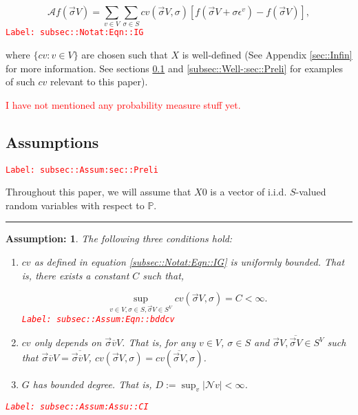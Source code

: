 \documentclass[12pt]{article}
\newcommand{\mb}{\mathbb}
\newcommand{\mc}{\mathcal}
\newcommand{\ov}{\overline}
\newcommand{\ep}{\epsilon}
\newcommand{\tr}{\textcolor{red}}
\newcommand{\labe}[1]{\tr{\texttt{Label: #1}}}
\newcommand{\lin}{\rule{\linewidth}{0.4 pt}}
\newcommand{\pr}{\mb{P}}							%
\newcommand{\defeq}{:=}								%
\renewcommand{\v}{v}							%
\renewcommand{\S}{S}							%
\newcommand{\s}{\sigma}							%
\newcommand{\sv}{\vec{\s}}						%
\newcommand{\ev}[1]{\ep^{#1}}					%
\newcommand{\X}{X}								%
\newcommand{\IG}{\mc{A}}						%
\newcommand{\IGr}{c}							%
\newcommand{\neigh}{\mc{N}}						%
\newcommand{\cl}{\ov}							%
\newcommand{\const}{C}							%
\newcommand{\degr}{D}							%
\newcommand{\XState}[1]{\S^{#1}}				%
\newtheorem{assu}[thms]{Assumption: }
\begin{document}
\begin{equation}
\IG f(\sv{}{ V}) = \sum_{\v \in  V}\sum_{\s \in \S} \IGr{\v}(\sv{}{ V},\s)[f(\sv{}{ V} + \s \ev{\v}) - f(\sv{}{ V})],
\label{subsec::Notat:Eqn::IG}
\end{equation}
\labe{subsec::Notat:Eqn::IG}

where \(\{\IGr{\v}:\v\in  V\}\) are chosen such that \(\X{}{}\) is well-defined (See Appendix \ref{sec::Infin} for more information. See sections \ref{subsec::Assum:sec::Preli} and \ref{subsec::Well-:sec::Preli} for examples of such \(\IGr{\v}\) relevant to this paper). 

\tr{I have not mentioned any probability measure stuff yet.}

\subsection{Assumptions}
\label{subsec::Assum:sec::Preli}\labe{subsec::Assum:sec::Preli}

Throughout this paper, we will assume that \(\X{}{0}\) is a vector of i.i.d. \(\S\)-valued random variables with respect to \(\pr\).

\lin

\begin{assu}
The following three conditions hold:
\begin{enumerate}
\item \(\IGr{\v}\) as defined in equation \eqref{subsec::Notat:Eqn::IG} is uniformly bounded. That is, there exists a constant \(\const{}\) such that,

\begin{equation}
\sup_{\v\in  V,\s \in \S,\sv{}{ V}\in \S^ V} \IGr{\v}(\sv{}{ V},\s) = \const{} < \infty.
\label{subsec::Assum:Eqn::bddcv}
\end{equation}
\labe{subsec::Assum:Eqn::bddcv}

\item \(\IGr{\v}\) only depends on \(\sv{\cl{\v}}{ V}\). That is, for any \(\v\in  V\), \(\s\in \S\) and \(\sv{}{ V},\ov{\sv{}{ V}} \in \S^ V\) such that \(\sv{\cl{\v}}{ V} = \ov{\sv{\cl{\v}}{ V}}\), \(\IGr{\v}(\sv{}{ V},\s) = \IGr{\v}(\ov{\sv{}{ V}},\s)\).

\item \(G\) has bounded degree. That is, \(\degr \defeq \sup_\v |\neigh{\v}| < \infty\).
\end{enumerate}
\label{subsec::Assum:Assu::CI}\labe{subsec::Assum:Assu::CI}
\end{assu}
\end{document}
